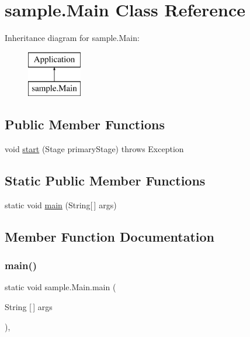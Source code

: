\hypertarget{classsample_1_1_main}{}\section{sample.\+Main Class Reference}
\label{classsample_1_1_main}
Inheritance diagram for sample.\+Main\+:\begin{figure}[H]
\begin{center}
\leavevmode
\includegraphics[height=2.000000cm]{classsample_1_1_main}
\end{center}
\end{figure}
\subsection*{Public Member Functions}
\begin{DoxyCompactItemize}
\item 
void \mbox{\hyperlink{classsample_1_1_main_a64ba37c898ca967654307543954cd09d}{start}} (Stage primary\+Stage)  throws Exception
\end{DoxyCompactItemize}
\subsection*{Static Public Member Functions}
\begin{DoxyCompactItemize}
\item 
static void \mbox{\hyperlink{classsample_1_1_main_ab70e98057c0f40b833a38ea10a74eceb}{main}} (String\mbox{[}$\,$\mbox{]} args)
\end{DoxyCompactItemize}


\subsection{Member Function Documentation}
\mbox{\label{classsample_1_1_main_ab70e98057c0f40b833a38ea10a74eceb}} 
\subsubsection{\texorpdfstring{main()}{main()}}
{\footnotesize\ttfamily static void sample.\+Main.\+main (\begin{DoxyParamCaption}\item[{String \mbox{[}$\,$\mbox{]}}]{args }\end{DoxyParamCaption})\hspace{0.3cm}{\ttfamily [inline]}, {\ttfamily [static]}}

